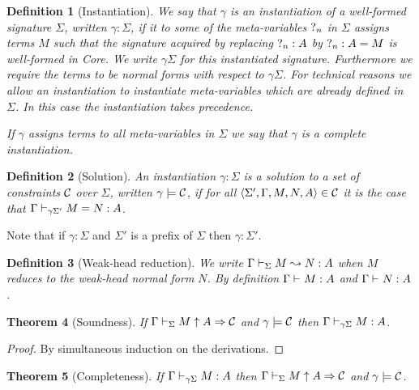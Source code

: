 \documentclass[11pt]{article}
\newtheorem{theorem}{Theorem}[section]
\newtheorem{definition}[theorem]{Definition}
\begin{document}
\begin{definition}[Instantiation]
    We say that $\gamma$ is an {\em instantiation} of a well-formed signature
    $\Sigma$, written $\gamma:\Sigma$, if it to some of the meta-variables
    ${?_{n}}$ in $\Sigma$ assigns terms $M$ such that the signature acquired by
    replacing ${?_{n}}:A$ by ${?_{n}}:A=M$ is well-formed in Core. We write
    $\gamma\Sigma$ for this instantiated signature.  Furthermore we require the
    terms to be normal forms with respect to $\gamma\Sigma$. For technical
    reasons we allow an instantiation to instantiate meta-variables which are
    already defined in $\Sigma$. In this case the instantiation takes
    precedence.

    If $\gamma$ assigns terms to all meta-variables in $\Sigma$ we say that
    $\gamma$ is a {\em complete instantiation}.
\end{definition}

\begin{definition}[Solution]
    An instantiation $\gamma:\Sigma$ is a {\em solution} to a set of
    constraints $\mathcal C$ over $\Sigma$, written $\gamma\models\mathcal C$, if for all
    $\langle\Sigma',\Gamma,M,N,A\rangle\in\mathcal C$ it is the case that
    $\Gamma\vdash_{\gamma{\Sigma'}}M=N:A$.
\end{definition}

Note that if $\gamma:\Sigma$ and $\Sigma'$ is a prefix of $\Sigma$ then $\gamma:\Sigma'$.

\begin{definition}[Weak-head reduction]
    We write $\Gamma\vdash_{\Sigma}M\leadsto N:A$ when $M$ reduces to the weak-head normal
    form $N$. By definition $\Gamma\vdash_{}M:A$ and $\Gamma\vdash_{}N:A$.
\end{definition}

\begin{theorem}[Soundness]\label{typeCheckSoundThm}
    If $\Gamma\vdash_{\Sigma}M\uparrow A{}\Rightarrow{}\mathcal C$ and $\gamma\models\mathcal C$ then $\Gamma\vdash_{\gamma\Sigma}M:A$.
\end{theorem}

\begin{proof}
    By simultaneous induction on the derivations.
\end{proof}

\begin{theorem}[Completeness]\label{typeCheckCompleteThm}
    If $\Gamma\vdash_{\gamma\Sigma}M:A$ then $\Gamma\vdash_{\Sigma}M\uparrow A{}\Rightarrow{}\mathcal C$ and $\gamma\models\mathcal C$.
\end{theorem}
\end{document}
